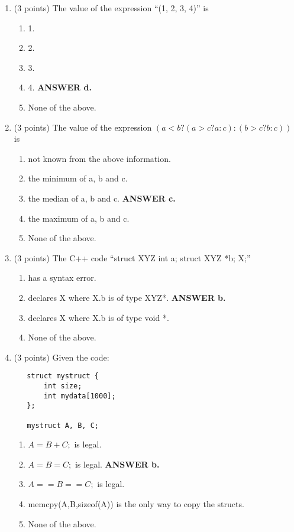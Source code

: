 \documentclass{article}
\newcommand{\ans}[1]{ \ifnum\showans=1 {\bf ANSWER #1.} \fi }
\begin{document}
\begin{enumerate}
\item (3 points) The value of the expression ``(1, 2, 3, 4)'' is
  \begin{enumerate} 
  \item 1. 
  \item 2.
  \item 3.
  \item 4.  \ans{d}
  \item None of the above.
  \end{enumerate}

\newpage
\item (3 points) The value of the expression
$( a<b ? (a>c ? a : c) : (b>c ? b : c) )$ is

  \begin{enumerate}
  \item not known from the above information.
  \item the minimum of a, b and c.
  \item the median of a, b and c. \ans{c}
  \item the maximum of a, b and c.
  \item None of the above. 
  \end{enumerate}

\item (3 points) The C++ code ``struct XYZ { int a; struct XYZ *b; } X;'' 
  \begin{enumerate}
  \item has a syntax error.
  \item declares X where X.b is of type XYZ*.  \ans{b}
  \item declares X where X.b is of type void *.
  \item None of the above.
  \end{enumerate}

\item (3 points) Given the code:
\begin{verbatim}
   struct mystruct {
       int size;
       int mydata[1000];
   };

   mystruct A, B, C;
\end{verbatim}
  \begin{enumerate}
  \item $A=B+C;$ is legal.
  \item $A=B=C;$ is legal.  \ans{b}
  \item $A==B==C;$ is legal.
  \item memcpy(A,B,sizeof(A)) is the only way to copy the structs.
  \item None of the above.
  \end{enumerate}



\end{enumerate}
\end{document}
